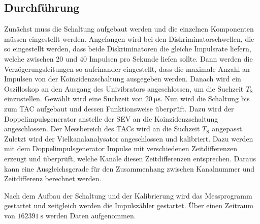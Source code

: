 \subsection{Durchführung}
Zunächst muss die Schaltung aufgebaut werden und die einzelnen Komponenten müssen eingestellt werden. Angefangen wird bei den Diskriminatorschwellen, die so eingestellt werden, dass
beide Diskriminatoren die gleiche Impulsrate liefern, welche zwischen 20 und 40 Impulsen pro Sekunde liefen sollte. Dann werden die Verzögerungsleitungen so aufeinander eingestellt, dass
die maximale Anzahl an Impulsen von der Koinzidenzschaltung ausgegeben werden. Danach wird ein Oszilloskop an den Ausgang des Univibrators angeschlossen, um die Suchzeit $T_\text{S}$ einzustellen.
Gewählt wird eine Suchzeit von $\SI{20}{\micro\second}$. Nun wird die Schaltung bis zum TAC aufgebaut und dessen Funktionsweise überprüft. Dazu wird der Doppelimpulsgenerator anstelle der SEV an die
Koinzidenzschaltung angeschlossen. Der Messbereich des TACs wird an die Suchzeit $T_\text{S}$ angepasst. Zuletzt wird der Vielkanalanalysator angeschlossen und kalibriert. Dazu werden mit dem Doppelimpulsgenerator
Impulse mit verschiedenen Zeitdifferenzen erzeugt und überprüft, welche Kanäle diesen Zeitdifferenzen entsprechen. Daraus kann eine Ausgleichsgerade für den Zusammenhang zwischen Kanalnummer und Zeitdifferenz berechnet
werden.

Nach dem Aufbau der Schaltung und der Kalibrierung wird das Messprogramm gestartet und zeitgleich werden die Impulszähler gestartet. Über einen Zeitraum von $\SI{162391}{\second}$ werden Daten aufgenommen.
